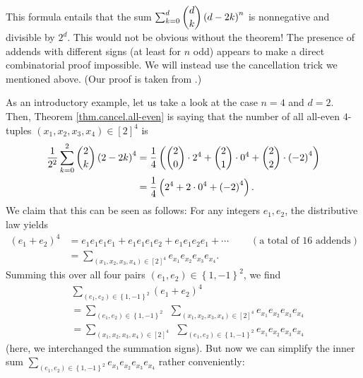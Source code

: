 This formula entails that the sum $\sum_{k=0}^{d}\dbinom{d}{k}\left(
d-2k\right)  ^{n}$ is nonnegative and divisible by $2^{d}$. This would not be
obvious without the theorem! The presence of addends with different signs (at
least for $n$ odd) appears to make a direct combinatorial proof impossible. We
will instead use the cancellation trick we mentioned above. (Our proof is
taken from \cite[solution to Exercise 7]{18f-hw4s}.)

As an introductory example, let us take a look at the case $n=4$ and $d=2$.
Then, Theorem \ref{thm.cancel.all-even} is saying that the number of all
all-even $4$-tuples $\left(  x_{1},x_{2},x_{3},x_{4}\right)  \in\left[
2\right]  ^{4}$ is
\begin{align*}
\dfrac{1}{2^{2}}\sum_{k=0}^{2}\dbinom{2}{k}\left(  2-2k\right)  ^{4}  &
=\dfrac{1}{4}\left(  \dbinom{2}{0}\cdot2^{4}+\dbinom{2}{1}\cdot0^{4}%
+\dbinom{2}{2}\cdot\left(  -2\right)  ^{4}\right) \\
&  =\dfrac{1}{4}\left(  2^{4}+2\cdot0^{4}+\left(  -2\right)  ^{4}\right)  .
\end{align*}
We claim that this can be seen as follows: For any integers $e_{1},e_{2}$, the
distributive law yields%
\begin{align*}
\left(  e_{1}+e_{2}\right)  ^{4}  &  =e_{1}e_{1}e_{1}e_{1}+e_{1}e_{1}%
e_{1}e_{2}+e_{1}e_{1}e_{2}e_{1}+\cdots\ \ \ \ \ \ \ \ \ \ \left(  \text{a
total of }16\text{ addends}\right) \\
&  =\sum_{\left(  x_{1},x_{2},x_{3},x_{4}\right)  \in\left[  2\right]  ^{4}%
}e_{x_{1}}e_{x_{2}}e_{x_{3}}e_{x_{4}}.
\end{align*}
Summing this over all four pairs $\left(  e_{1},e_{2}\right)  \in\left\{
1,-1\right\}  ^{2}$, we find%
\begin{align}
&  \sum_{\left(  e_{1},e_{2}\right)  \in\left\{  1,-1\right\}  ^{2}}\left(
e_{1}+e_{2}\right)  ^{4}\nonumber\\
&  =\sum_{\left(  e_{1},e_{2}\right)  \in\left\{  1,-1\right\}  ^{2}}%
\ \ \sum_{\left(  x_{1},x_{2},x_{3},x_{4}\right)  \in\left[  2\right]  ^{4}%
}e_{x_{1}}e_{x_{2}}e_{x_{3}}e_{x_{4}}\nonumber\\
&  =\sum_{\left(  x_{1},x_{2},x_{3},x_{4}\right)  \in\left[  2\right]  ^{4}%
}\ \ \sum_{\left(  e_{1},e_{2}\right)  \in\left\{  1,-1\right\}  ^{2}}%
e_{x_{1}}e_{x_{2}}e_{x_{3}}e_{x_{4}} \label{eq.thm.cancel.all-even.ex1}%
\end{align}
(here, we interchanged the summation signs). But now we can simplify the inner
sum $\sum_{\left(  e_{1},e_{2}\right)  \in\left\{  1,-1\right\}  ^{2}}%
e_{x_{1}}e_{x_{2}}e_{x_{3}}e_{x_{4}}$ rather conveniently:

